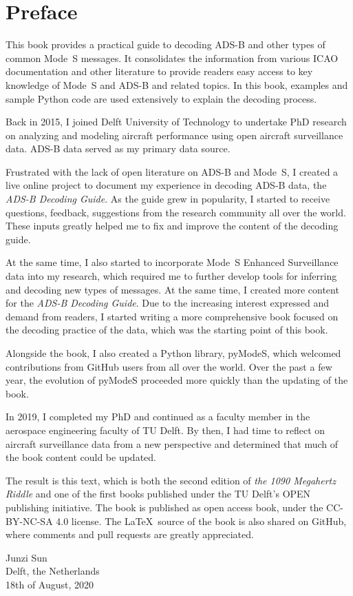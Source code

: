 \chapter*{Preface}

This book provides a practical guide to decoding ADS-B and other types of common Mode~S messages. It consolidates the information from various ICAO documentation and other literature to provide readers easy access to key knowledge of Mode~S and ADS-B and related topics. In this book, examples and sample Python code are used extensively to explain the decoding process.

Back in 2015, I joined Delft University of Technology to undertake PhD research on analyzing and modeling aircraft performance using open aircraft surveillance data. ADS-B data served as my primary data source.

Frustrated with the lack of open literature on ADS-B and Mode~S, I created a live online project to document my experience in decoding ADS-B data, the \emph{ADS-B Decoding Guide}. As the guide grew in popularity, I started to receive questions, feedback, suggestions from the research community all over the world. These inputs greatly helped me to fix and improve the content of the decoding guide.

At the same time, I also started to incorporate Mode~S Enhanced Surveillance data into my research, which required me to further develop tools for inferring and decoding new types of messages. At the same time, I created more content for the \emph{ADS-B Decoding Guide}. Due to the increasing interest expressed and demand from readers, I started writing a more comprehensive book focused on the decoding practice of the data, which was the starting point of this book.

Alongside the book, I also created a Python library, pyModeS, which welcomed contributions from GitHub users from all over the world. Over the past a few year, the evolution of pyModeS proceeded more quickly than the updating of the book. 

In 2019, I completed my PhD and continued as a faculty member in the aerospace engineering faculty of TU Delft. By then, I had time to reflect on aircraft surveillance data from a new perspective and determined that much of the book content could be updated.

The result is this text, which is both the second edition of \emph{the 1090 Megahertz Riddle} and one of the first books published under the TU Delft's OPEN publishing initiative. The book is published as open access book, under the CC-BY-NC-SA 4.0 license. The \LaTeX~source of the book is also shared on GitHub, where comments and pull requests are greatly appreciated.

\vspace{1cm}

\begin{flushright}
  Junzi Sun \\
  Delft, the Netherlands \\
  18th of August, 2020
\end{flushright}
